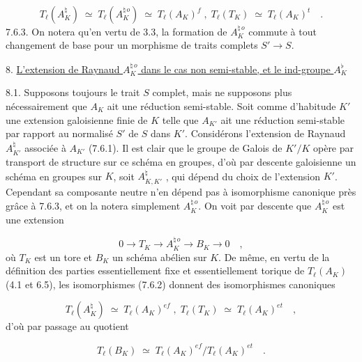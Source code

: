 \begin{equation}\tag{7.6.2}
T_{\ell}(A_K^{\natural}) \;\simeq\; T_{\ell}(A_K^{\natural\,o}) \;\simeq\; T_{\ell}(A_K)^{f} \; , \; T_{\ell}(T_K) \;\simeq\; T_{\ell}(A_K)^{t} \quad .
\end{equation}
7.6.3. On notera qu'en vertu de 3.3, la formation de $A_K^{\natural\,o}$ commute à tout changement de base pour un morphisme de traits complets $S' \longrightarrow S$.




8. \underline{L'extension de Raynaud $A_K^{\natural\,o}$ dans le cas non semi-stable, et le ind-groupe $A_K^{\flat}$}

8.1. Supposons toujours le trait $S$ complet, mais ne supposons plus nécessairement que $A_K$ ait une réduction semi-stable. Soit comme d'habitude $K'$ une extension galoisienne finie de $K$ telle que $A_{K'}$ ait une réduction semi-stable par rapport au normalisé $S'$ de $S$ dans $K'$. Considérons l'extension de Raynaud $A_{K'}^{\natural}$ associée à $A_{K'}$ (7.6.1). Il est clair que le groupe de Galois de $K'/K$ opère par transport de structure sur ce schéma en groupes, d'où par descente galoisienne un schéma en groupes sur $K$, soit $A_{K,K'}^{\natural}$ , qui dépend du choix de l'extension $K'$. Cependant sa composante neutre n'en dépend pas à isomorphisme canonique près grâce à 7.6.3, et on la notera simplement $A_K^{\natural\,o}$. On voit par descente que $A_K^{\natural\,o}$ est une extension

\begin{equation}\tag{8.1.1}
0 \longrightarrow T_K \longrightarrow A_K^{\natural\,o} \longrightarrow B_K \longrightarrow 0 \quad ,
\end{equation}
où $T_K$ est un tore et $B_K$ un schéma abélien sur $K$. De même, en vertu de la définition des parties essentiellement fixe et essentiellement torique de $T_{\ell}(A_K)$ (4.1 et 6.5), les isomorphismes (7.6.2) donnent des isomorphismes canoniques

\begin{equation}\tag{8.1.2}
T_{\ell}(A_K^{\natural}) \;\simeq\; T_{\ell}(A_K)^{ef} \; , \; T_{\ell}(T_K) \;\simeq\; T_{\ell}(A_K)^{et} \quad ,
\end{equation}
d'où par passage au quotient

\begin{equation}\tag{8.1.3}
T_{\ell}(B_K) \;\simeq\; T_{\ell}(A_K)^{ef}/T_{\ell}(A_K)^{et} \quad .
\end{equation}

